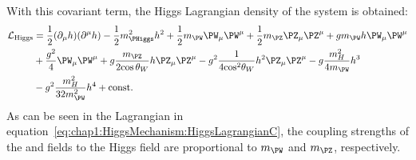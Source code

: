 With this covariant term, the Higgs Lagrangian density of the system is obtained:
\begin{equation}\label{eq:chap1:HiggsMechanism:HiggsLagrangianC}
\begin{split}
	\mathcal{L}_{\text{Higgs}} 	&= \frac{1}{2} (\partial_{\mu}h) (\partial^{\mu}h)  - \frac{1}{2}m^{2}_{\PHiggs}h^{2}+\frac{1}{2}m_{\PW}\PW_{\mu}\PW^{\mu}+\frac{1}{2}m_{\PZ}\PZ_{\mu}\PZ^{\mu} + g m_{\PW} h \PW_{\mu}\PW^{\mu} \\
					&+ \frac{g^{2}}{4}\PW_{\mu}\PW^{\mu} + g \frac{m_{\PZ}}{2 \textrm{cos}\,\theta_{W}} h \PZ_{\mu}\PZ^{\mu} - g^{2}\frac{1}{4 \textrm{cos}^{2}\theta_{W}}h^{2}\PZ_{\mu}\PZ^{\mu} 
					 -g \frac{m^{2}_{H}}{4 m_{\PW}}h^{3} \\
					& -g^{2}\frac{m^{2}_{H}}{32 m^{2}_{\PW}}h^{4}+\textrm{const.}
\end{split}
\end{equation}
As can be seen in the Lagrangian in equation~\ref{eq:chap1:HiggsMechanism:HiggsLagrangianC}, the coupling strengths of the \PW and \PZ 
fields to the Higgs field are proportional to $m_{\PW}$ and $m_{\PZ}$, respectively.


